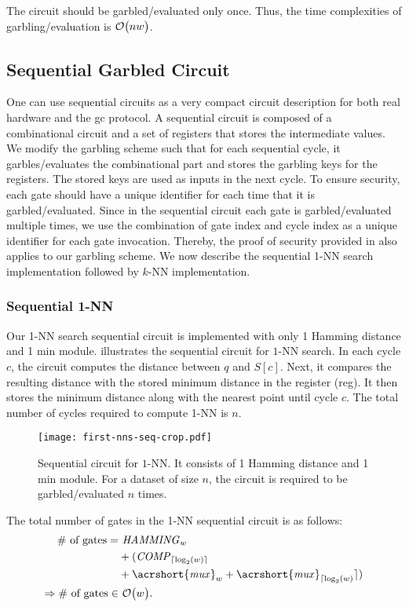 The circuit should be garbled/evaluated only once.
Thus, the time complexities of garbling/evaluation is $\mathcal{O}\bigl(nw\bigr)$.

\subsection{Sequential Garbled Circuit}\label{ssec:knn-seqgc}
One can use sequential circuits as a very compact circuit description for both real hardware and the \acrshort{gc} protocol.
A sequential circuit is composed of a combinational circuit and a set of registers that stores the intermediate values.
We modify the garbling scheme such that for each sequential cycle, it garbles/evaluates the combinational part and stores the garbling keys for the registers.
The stored keys are used as inputs in the next cycle.
To ensure security, each gate should have a unique identifier for each time that it is garbled/evaluated.
Since in the sequential circuit each gate is garbled/evaluated multiple times, we use the combination of gate index and cycle index as a unique identifier for each gate invocation.
Thereby, the proof of security provided in \cite{lindell2009proof,bellare2013efficient} also applies to our garbling scheme.
We now describe the sequential 1-NN search implementation followed by $k$-NN implementation.

\subsubsection{Sequential 1-NN}
Our 1-NN search sequential circuit is implemented with only 1 Hamming distance and 1 min module.
 illustrates the sequential circuit for $1$-NN search.
In each cycle $c$, the circuit computes the distance between $q$ and $S[c]$.
Next, it compares the resulting distance with the stored minimum distance in the register (reg).
It then stores the minimum distance along with the nearest point until cycle $c$.
The total number of cycles required to compute 1-NN is $n$.

\begin{figure}
\centering
\texttt{[image: first-nns-seq-crop.pdf]}
\caption{Sequential circuit for $1$-NN.
It consists of 1 Hamming distance and 1 min module.
For a dataset of size $n$, the circuit is required to be garbled/evaluated $n$ times.}
\label{fig:fist-nns-seq}
\end{figure}

The total number of gates in the 1-NN sequential circuit is as follows:
\begin{align*}
\text{\# of gates}=	& ~ \mathit{HAMMING}_{w}\\
					& + (\mathit{COMP}_{\lceil \log _2(w) \rceil} \\
					& + \mathit{\acrshort{mux}}_w + \mathit{\acrshort{mux}}_{\lceil \log _2(w)} \rceil)\\
\Rightarrow \text{\# of gates} \in & ~ \BigO{w}.
\end{align*}

